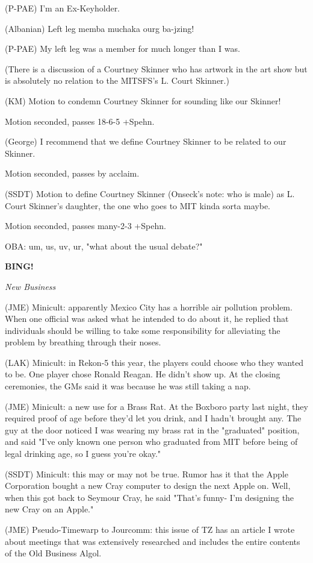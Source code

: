 \documentclass[12pt]{article}
\newcommand{\bing}{{\bf BING!} }
\newcommand{\goto}[1]{\bing \vskip 12pt \centerline{{\em{#1}}}}
\begin{document}
(P-PAE) I'm an Ex-Keyholder.

(Albanian) Left leg memba muchaka ourg ba-jzing!

(P-PAE) My left leg was a member for much longer than I was.

(There is a discussion of a Courtney Skinner who has artwork in the art show but is absolutely no relation to the MITSFS's L. Court Skinner.)

(KM) Motion to condemn Courtney Skinner for sounding like our Skinner!

Motion seconded, passes 18-6-5 +Spehn.

(George) I recommend that we define Courtney Skinner to be related to our Skinner.

Motion seconded, passes by acclaim.

(SSDT) Motion to define Courtney Skinner (Onseck's note: who is male) as L. Court Skinner's daughter, the one who goes to MIT kinda sorta maybe.

Motion seconded, passes many-2-3 +Spehn.

OBA: um, us, uv, ur, "what about the usual debate?"

\goto{New Business}

(JME) Minicult: apparently Mexico City has a horrible air pollution problem. When one official was asked what he intended to do about it, he replied that individuals should be willing to take some responsibility for alleviating the problem by breathing through their noses.

(LAK) Minicult: in Rekon-5 this year, the players could choose who they wanted to be. One player chose Ronald Reagan. He didn't show up. At the closing ceremonies, the GMs said it was because he was still taking a nap.

(JME) Minicult: a new use for a Brass Rat. At the Boxboro party last night, they required proof of age before they'd let you drink, and I hadn't brought any. The guy at the door noticed I was wearing my brass rat in the "graduated" position, and said "I've only known one person who graduated from MIT before being of legal drinking age, so I guess you're okay."

(SSDT) Minicult: this may or may not be true. Rumor has it that the Apple Corporation bought a new Cray computer to design the next Apple on. Well, when this got back to Seymour Cray, he said "That's funny- I'm designing the new Cray on an Apple."

(JME) Pseudo-Timewarp to Jourcomm: this issue of TZ has an article I wrote about meetings that was extensively researched and includes the entire contents of the Old Business Algol.
\end{document}
